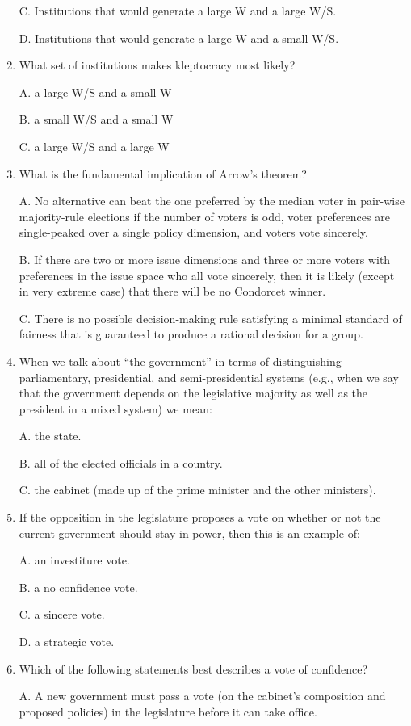 \documentclass[
]{book}
\begin{document}
\begin{enumerate}
  C. Institutions that would generate a large W and a large W/S.

  D. Institutions that would generate a large W and a small W/S.
\item
  What set of institutions makes kleptocracy most likely?

  A. a large W/S and a small W

  B. a small W/S and a small W

  C. a large W/S and a large W
\item
  What is the fundamental implication of Arrow's theorem?

  A. No alternative can beat the one preferred by the median voter in pair-wise majority-rule elections if the number of voters is odd, voter preferences are single-peaked over a single policy dimension, and voters vote sincerely.

  B. If there are two or more issue dimensions and three or more voters with preferences in the issue space who all vote sincerely, then it is likely (except in very extreme case) that there will be no Condorcet winner.

  C. There is no possible decision-making rule satisfying a minimal standard of fairness that is guaranteed to produce a rational decision for a group.
\item
  When we talk about ``the government'' in terms of distinguishing parliamentary, presidential, and semi-presidential systems (e.g., when we say that the government depends on the legislative majority as well as the president in a mixed system) we mean:

  A. the state.

  B. all of the elected officials in a country.

  C. the cabinet (made up of the prime minister and the other ministers).
\item
  If the opposition in the legislature proposes a vote on whether or not the current government should stay in power, then this is an example of:

  A. an investiture vote.

  B. a no confidence vote.

  C. a sincere vote.

  D. a strategic vote.
\item
  Which of the following statements best describes a vote of confidence?

  A. A new government must pass a vote (on the cabinet's composition and proposed policies) in the legislature before it can take office.


\end{enumerate}
\end{document}
